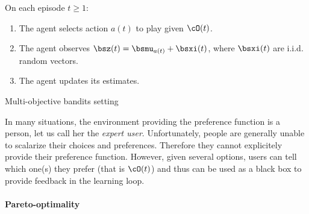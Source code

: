 \begin{algorithm}[t]
    On each episode $t \geq 1$:
    \begin{enumerate}[nolistsep]
        \item The agent selects action $a(t)$ to play given $\cO(t)$.
        \item The agent observes $\bsz(t) = \bsmu_{a(t)} + \bsxi(t)$, where $\bsxi(t)$ are i.i.d. random vectors.
        \item The agent updates its estimates.
    \end{enumerate}
    \caption{Multi-objective bandits setting}
\label{alg:mobandits}
\end{algorithm}

In many situations, the environment providing the preference function is a person, let us call her the \emph{expert user}. Unfortunately, people are generally unable to scalarize their choices and preferences. Therefore they cannot explicitely provide their preference function. However, given several options, users can tell which one(s) they prefer (that is $\cO(t)$) and thus can be used as a black box to provide feedback in the learning loop.
%


\paragraph{Pareto-optimality}

